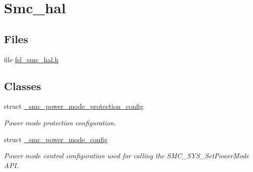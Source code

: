 \hypertarget{group__smc__hal}{}\section{Smc\+\_\+hal}
\label{group__smc__hal}
\subsection*{Files}
\begin{DoxyCompactItemize}
\item 
file \hyperlink{fsl__smc__hal_8h}{fsl\+\_\+smc\+\_\+hal.\+h}
\end{DoxyCompactItemize}
\subsection*{Classes}
\begin{DoxyCompactItemize}
\item 
struct \hyperlink{struct__smc__power__mode__protection__config}{\+\_\+smc\+\_\+power\+\_\+mode\+\_\+protection\+\_\+config}
\begin{DoxyCompactList}\small\item\em Power mode protection configuration. \end{DoxyCompactList}\item 
struct \hyperlink{struct__smc__power__mode__config}{\+\_\+smc\+\_\+power\+\_\+mode\+\_\+config}
\begin{DoxyCompactList}\small\item\em Power mode control configuration used for calling the S\+M\+C\+\_\+\+S\+Y\+S\+\_\+\+Set\+Power\+Mode A\+PI. \end{DoxyCompactList}\end{DoxyCompactItemize}
